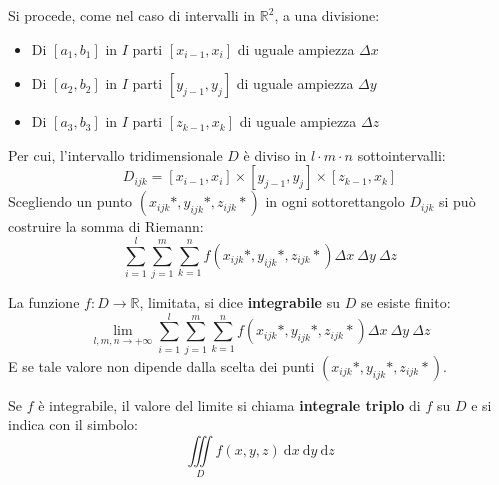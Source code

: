 \documentclass[a4paper]{article}
\newcommand{\definition}[1]{\textcolor{Red3}{\textbf{#1}}}
\begin{document}
	\noindent
	Si procede, come nel caso di intervalli in $\mathbb{R}^{2}$, a una divisione:
	\begin{itemize}
		\item Di $\left[a_{1}, b_{1}\right]$ in $I$ parti $\left[x_{i-1}, x_{i}\right]$ di uguale ampiezza $\Delta x$

		\item Di $\left[a_{2}, b_{2}\right]$ in $I$ parti $\left[y_{j-1}, y_{j}\right]$ di uguale ampiezza $\Delta y$

		\item Di $\left[a_{3}, b_{3}\right]$ in $I$ parti $\left[z_{k-1}, x_{k}\right]$ di uguale ampiezza $\Delta z$
	\end{itemize}
	Per cui, l'intervallo tridimensionale $D$ è diviso in $l \cdot m \cdot n$ sottointervalli:
	\begin{equation*}
		D_{ijk} = \left[x_{i-1}, x_{i}\right] \times \left[y_{j-1}, y_{j}\right] \times \left[z_{k-1}, x_{k}\right]
	\end{equation*}
	Scegliendo un punto $\left(x_{ijk}*, y_{ijk}*, z_{ijk}*\right)$ in ogni sottorettangolo $D_{ijk}$ si può costruire la somma di Riemann:
	\begin{equation}\label{eq: somma di Riemann}
		\displaystyle\sum_{i=1}^{l}\sum_{j=1}^{m}\sum_{k=1}^{n} f\left(x_{ijk}*, y_{ijk}*, z_{ijk}*\right) \Delta x \: \Delta y \: \Delta z
	\end{equation}
	\begin{boxdef}
		La funzione $f: D \rightarrow \mathbb{R}$, limitata, si dice \definition{integrabile} su $D$ se esiste finito:
		\begin{equation}
			\displaystyle\lim_{l,m,n \rightarrow +\infty} \sum_{i=1}^{l}\sum_{j=1}^{m}\sum_{k=1}^{n} f\left(x_{ijk}*, y_{ijk}*, z_{ijk}*\right) \Delta x \: \Delta y \: \Delta z
		\end{equation}
		E se tale valore non dipende dalla scelta dei punti $\left(x_{ijk}*, y_{ijk}*, z_{ijk}*\right)$.

		Se $f$ è integrabile, il valore del limite si chiama \definition{integrale triplo} di $f$ su $D$ e si indica con il simbolo:
		\begin{equation}
			\displaystyle \iiint\limits_{D} f\left(x,y,z\right) \:\mathrm{d}x \:\mathrm{d}y \:\mathrm{d}z
		\end{equation}
	\end{boxdef}\newpage
\end{document}
